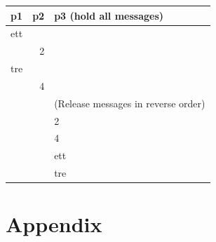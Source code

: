 \documentclass[titlepage, twocolumn, a4paper, 10pt]{article}
\begin{document}
\begin{tabular}{lrl}
p1 & p2 & p3 (hold all messages) \\
\hline
ett &  &  \\
 & 2 &  \\
tre &  &  \\
 & 4 &  \\
\hline
 &  & (Release messages in reverse order) \\
\hline
 &  & 2 \\
 &  & 4 \\
 &  & ett \\
 &  & tre \\
\end{tabular}

\newpage
\appendix
{}
\section{Appendix}\label{sec:kallkod}
\end{document}
